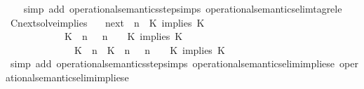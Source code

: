 \begin{isabellebody}
%
\isadelimproof
\ \ %
\endisadelimproof
%
\isatagproof
{}\isamarkupfalse%
\ {\isacharparenleft}simp\ add{\isacharcolon}\ operational{\isacharunderscore}semantics{\isacharunderscore}step{\isachardot}simps\ operational{\isacharunderscore}semantics{\isacharunderscore}elim{\isachardot}tagrel{\isacharunderscore}e{\isacharparenright}%
\endisatagproof
{\isafoldproof}%
%
\isadelimproof
\isanewline
%
\endisadelimproof
\isanewline
{}\isamarkupfalse%
\ Cnext{\isacharunderscore}solve{\isacharunderscore}implies{\isacharcolon}\isanewline
\ \ \ {\isachardoublequoteopen}{\isacharparenleft}{\isasymC}\isactrlsub n\isactrlsub e\isactrlsub x\isactrlsub t\ {\isacharparenleft}{\isasymGamma}{\isacharcomma}\ n\ {\isasymturnstile}\ {\isacharparenleft}{\isacharparenleft}K\ implies\ K\ {\isacharhash}\ {\isasymPsi}{\isacharparenright}\ {\isasymtriangleright}\ {\isasymPhi}{\isacharparenright}{\isacharparenright}\isanewline
\ \ \ \ \ \ \ \ \ \ {\isasymsupseteq}\ {\isacharbraceleft}\ {\isacharparenleft}{\isacharparenleft}K\ {\isasymnot}{\isasymUp}\ n{\isacharparenright}\ {\isacharhash}\ {\isasymGamma}{\isacharparenright}{\isacharcomma}\ n\ {\isasymturnstile}\ {\isasymPsi}\ {\isasymtriangleright}\ {\isacharparenleft}{\isacharparenleft}K\ implies\ K\ {\isacharhash}\ {\isasymPhi}{\isacharparenright}{\isacharcomma}\isanewline
\ \ \ \ \ \ \ \ \ \ \ \ \ \ {\isacharparenleft}{\isacharparenleft}K\ {\isasymUp}\ n{\isacharparenright}\ {\isacharhash}\ {\isacharparenleft}K\ {\isasymUp}\ n{\isacharparenright}\ {\isacharhash}\ {\isasymGamma}{\isacharparenright}{\isacharcomma}\ n\ {\isasymturnstile}\ {\isasymPsi}\ {\isasymtriangleright}\ {\isacharparenleft}{\isacharparenleft}K\ implies\ K\ {\isacharhash}\ {\isasymPhi}{\isacharparenright}{\isacharbraceright}{\isachardoublequoteclose}\isanewline
%
\isadelimproof
\ \ %
\endisadelimproof
%
\isatagproof
{}\isamarkupfalse%
\ {\isacharparenleft}simp\ add{\isacharcolon}\ operational{\isacharunderscore}semantics{\isacharunderscore}step{\isachardot}simps\ operational{\isacharunderscore}semantics{\isacharunderscore}elim{\isachardot}implies{\isacharunderscore}e{}\ operational{\isacharunderscore}semantics{\isacharunderscore}elim{\isachardot}implies{\isacharunderscore}e{}{\isacharparenright}%

\end{isabellebody}
